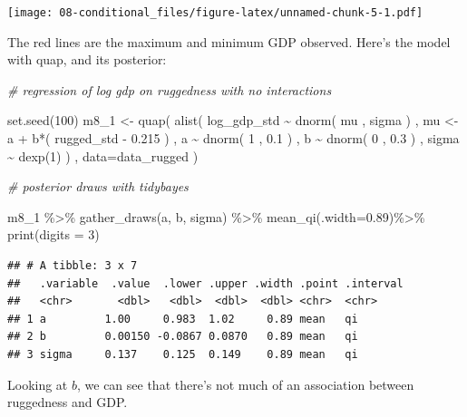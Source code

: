 \documentclass[
]{book}
\newenvironment{Shaded}{\begin{snugshade}}{\end{snugshade}}
\newcommand{\AttributeTok}[1]{\textcolor[rgb]{0.77,0.63,0.00}{#1}}
\newcommand{\CommentTok}[1]{\textcolor[rgb]{0.56,0.35,0.01}{\textit{#1}}}
\newcommand{\DecValTok}[1]{\textcolor[rgb]{0.00,0.00,0.81}{#1}}
\newcommand{\FloatTok}[1]{\textcolor[rgb]{0.00,0.00,0.81}{#1}}
\newcommand{\FunctionTok}[1]{\textcolor[rgb]{0.00,0.00,0.00}{#1}}
\newcommand{\NormalTok}[1]{#1}
\newcommand{\OtherTok}[1]{\textcolor[rgb]{0.56,0.35,0.01}{#1}}
\newcommand{\SpecialCharTok}[1]{\textcolor[rgb]{0.00,0.00,0.00}{#1}}
\begin{document}
\texttt{[image: 08-conditional\_files/figure-latex/unnamed-chunk-5-1.pdf]}

The red lines are the maximum and minimum GDP observed. Here's the model with quap, and its posterior:

\begin{Shaded}
\begin{Highlighting}[]
\CommentTok{\# regression of log gdp on ruggedness with no interactions}

\FunctionTok{set.seed}\NormalTok{(}\DecValTok{100}\NormalTok{)}
\NormalTok{m8\_1 }\OtherTok{\textless{}{-}} \FunctionTok{quap}\NormalTok{( }\FunctionTok{alist}\NormalTok{(}
\NormalTok{log\_gdp\_std }\SpecialCharTok{\textasciitilde{}} \FunctionTok{dnorm}\NormalTok{( mu , sigma ) , }
\NormalTok{mu }\OtherTok{\textless{}{-}}\NormalTok{ a }\SpecialCharTok{+}\NormalTok{ b}\SpecialCharTok{*}\NormalTok{( rugged\_std }\SpecialCharTok{{-}} \FloatTok{0.215}\NormalTok{ ) , }
\NormalTok{a }\SpecialCharTok{\textasciitilde{}} \FunctionTok{dnorm}\NormalTok{( }\DecValTok{1}\NormalTok{ , }\FloatTok{0.1}\NormalTok{ ) , }
\NormalTok{b }\SpecialCharTok{\textasciitilde{}} \FunctionTok{dnorm}\NormalTok{( }\DecValTok{0}\NormalTok{ , }\FloatTok{0.3}\NormalTok{ ) , sigma }\SpecialCharTok{\textasciitilde{}} \FunctionTok{dexp}\NormalTok{(}\DecValTok{1}\NormalTok{)}
\NormalTok{) , }\AttributeTok{data=}\NormalTok{data\_rugged )}

\CommentTok{\# posterior draws with tidybayes}

\NormalTok{m8\_1 }\SpecialCharTok{\%\textgreater{}\%}
  \FunctionTok{gather\_draws}\NormalTok{(a, b, sigma) }\SpecialCharTok{\%\textgreater{}\%}
  \FunctionTok{mean\_qi}\NormalTok{(}\AttributeTok{.width=}\FloatTok{0.89}\NormalTok{)}\SpecialCharTok{\%\textgreater{}\%}
  \FunctionTok{print}\NormalTok{(}\AttributeTok{digits =} \DecValTok{3}\NormalTok{)}
\end{Highlighting}
\end{Shaded}

\begin{verbatim}
## # A tibble: 3 x 7
##   .variable  .value  .lower .upper .width .point .interval
##   <chr>       <dbl>   <dbl>  <dbl>  <dbl> <chr>  <chr>    
## 1 a         1.00     0.983  1.02     0.89 mean   qi       
## 2 b         0.00150 -0.0867 0.0870   0.89 mean   qi       
## 3 sigma     0.137    0.125  0.149    0.89 mean   qi
\end{verbatim}

Looking at \(b\), we can see that there's not much of an association between ruggedness and GDP.
\end{document}
